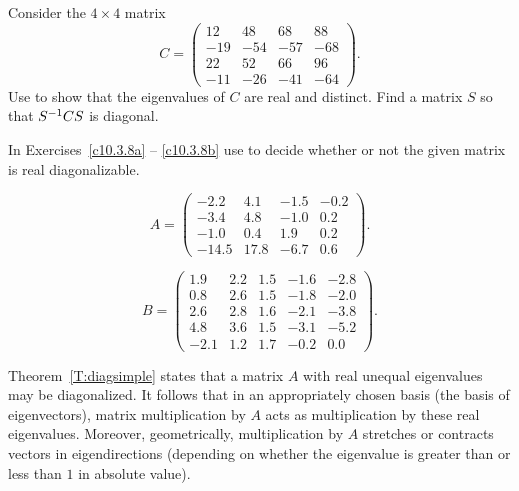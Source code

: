 \CEXER

\begin{exercise} \label{c10.3.7}
Consider the $4\times 4$ matrix
\begin{equation*}
C =\left(\begin{array}{rrrr}  12 & 48 & 68 & 88 \\ -19 & -54 & -57 & -68\\
22 & 52 & 66 & 96 \\ -11 & -26 & -41 & -64 \end{array}\right).
\end{equation*}
Use \Matlab to show that the eigenvalues of $C$ are real and distinct.
Find a matrix $S$ so that $S^{-1} CS$ is diagonal.  
\end{exercise}

\noindent In Exercises~\ref{c10.3.8a} -- \ref{c10.3.8b} use \Matlab 
to decide whether or not the given matrix is real diagonalizable.
\begin{exercise} \label{c10.3.8a}
\begin{equation*}
A=\left(
\begin{array}{rrrr}
      -2.2 & 4.1&-1.5&-0.2\\
      -3.4 & 4.8&-1.0& 0.2\\
      -1.0 & 0.4& 1.9& 0.2\\
     -14.5 &17.8&-6.7& 0.6
\end{array}
\right).
\end{equation*}
\end{exercise}
\begin{exercise} \label{c10.3.8b}
\begin{equation*}
B=\left(
\begin{array}{rrrrr}
      1.9 & 2.2 & 1.5 & -1.6 & -2.8\\
      0.8 & 2.6 & 1.5 & -1.8 & -2.0\\
      2.6 & 2.8 & 1.6 & -2.1 & -3.8\\
      4.8 & 3.6 & 1.5 & -3.1 & -5.2\\
     -2.1 & 1.2 & 1.7 & -0.2 &  0.0
\end{array} \right).
\end{equation*}
\end{exercise}



  \label{S:CSE}

Theorem~\ref{T:diagsimple} states that a matrix $A$ with real
unequal eigenvalues may be diagonalized. It follows that 
in an appropriately chosen basis (the basis of eigenvectors), 
matrix multiplication by $A$ acts 
as multiplication by these real eigenvalues.  Moreover, geometrically, 
multiplication by $A$ stretches or contracts vectors in 
eigendirections (depending on whether the eigenvalue is greater
than or less than $1$ in absolute value).

